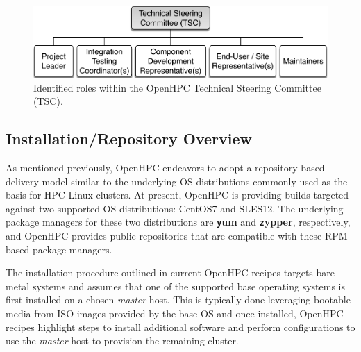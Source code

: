 \documentclass{sig-alternate-05-2015}
\begin{document}
\begin{figure}
  \includegraphics[width=1.0\linewidth]{figures/governance}
  \caption{Identified roles within the OpenHPC Technical Steering Committee (TSC).}
  \label{fig:tsc_governance}
\end{figure}

\subsection{Installation/Repository Overview}
\label{sec:repo_enable}

As mentioned previously, OpenHPC endeavors to adopt a repository-based delivery
model similar to the underlying OS distributions commonly used as the basis for HPC
Linux clusters.  At present, OpenHPC is providing builds targeted against two
supported OS distributions: CentOS7 and SLES12. The underlying package
managers for these two distributions are {\bf \texttt yum} and {\bf \texttt zypper},
respectively, and OpenHPC provides public repositories that are compatible with
these RPM-based package managers.

The installation procedure outlined in current OpenHPC recipes targets
bare-metal systems and assumes that one of the supported base operating systems
is first installed on a chosen {\em master} host. This is typically done
leveraging bootable media from ISO images provided by the base OS and once
installed, OpenHPC recipes highlight steps to install additional software and
perform configurations to use the {\em master} host to provision the remaining
cluster.
\end{document}

